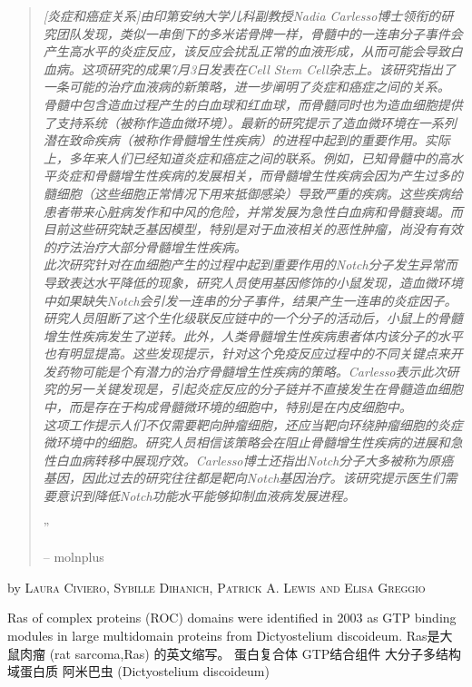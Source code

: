\documentclass[10pt,a4paper]{article}
\newcommand{\NewsItem}[1]{ %
\usefont{T1}{fvs}{n}{n} %
\vspace{24pt}\large #1\vspace{3pt} %
\par \normalsize \normalfont}
\newcommand{\NewsAuthor}[1]{ %
\hfill by \textsc{#1} \vspace{20pt} %
\par \normalfont}
\begin{document}
\begin{multicols}{2}
\begin{quotation}

\noindent\normalsize\textit{[炎症和癌症关系]由印第安纳大学儿科副教授Nadia Carlesso博士领衔的研究团队发现，类似一串倒下的多米诺骨牌一样，骨髓中的一连串分子事件会产生高水平的炎症反应，该反应会扰乱正常的血液形成，从而可能会导致白血病。这项研究的成果7月3日发表在Cell Stem Cell杂志上。该研究指出了一条可能的治疗血液病的新策略，进一步阐明了炎症和癌症之间的关系。\\
骨髓中包含造血过程产生的白血球和红血球，而骨髓同时也为造血细胞提供了支持系统（被称作造血微环境）。最新的研究提示了造血微环境在一系列潜在致命疾病（被称作骨髓增生性疾病）的进程中起到的重要作用。实际上，多年来人们已经知道炎症和癌症之间的联系。例如，已知骨髓中的高水平炎症和骨髓增生性疾病的发展相关，而骨髓增生性疾病会因为产生过多的髓细胞（这些细胞正常情况下用来抵御感染）导致严重的疾病。这些疾病给患者带来心脏病发作和中风的危险，并常发展为急性白血病和骨髓衰竭。而目前这些研究缺乏基因模型，特别是对于血液相关的恶性肿瘤，尚没有有效的疗法治疗大部分骨髓增生性疾病。\\
此次研究针对在血细胞产生的过程中起到重要作用的Notch分子发生异常而导致表达水平降低的现象，研究人员使用基因修饰的小鼠发现，造血微环境中如果缺失Notch会引发一连串的分子事件，结果产生一连串的炎症因子。研究人员阻断了这个生化级联反应链中的一个分子的活动后，小鼠上的骨髓增生性疾病发生了逆转。此外，人类骨髓增生性疾病患者体内该分子的水平也有明显提高。这些发现提示，针对这个免疫反应过程中的不同关键点来开发药物可能是个有潜力的治疗骨髓增生性疾病的策略。Carlesso表示此次研究的另一关键发现是，引起炎症反应的分子链并不直接发生在骨髓造血细胞中，而是存在于构成骨髓微环境的细胞中，特别是在内皮细胞中。\\
这项工作提示人们不仅需要靶向肿瘤细胞，还应当靶向环绕肿瘤细胞的炎症微环境中的细胞。研究人员相信该策略会在阻止骨髓增生性疾病的进展和急性白血病转移中展现疗效。Carlesso博士还指出Notch分子大多被称为原癌基因，因此过去的研究往往都是靶向Notch基因治疗。该研究提示医生们需要意识到降低Notch功能水平能够抑制血液病发展进程。}


\hfill{\Huge''}

\hfill-- molnplus
\end{quotation}

\NewsItem{{\color{hugoteal}{Genetic, Structural, and Molecular Insights into the Function of Ras of Complex Proteins Domains}}}
\NewsAuthor{Laura Civiero, Sybille Dihanich, Patrick A. Lewis and Elisa Greggio}

Ras of complex proteins (ROC) domains were identified in 2003 as GTP binding modules in large multidomain proteins from Dictyostelium discoideum.
Ras是大鼠肉瘤 (rat sarcoma,Ras) 的英文缩写。
蛋白复合体
GTP结合组件
大分子多结构域蛋白质
阿米巴虫 (Dictyostelium discoideum)



\end{multicols}
\end{document}
